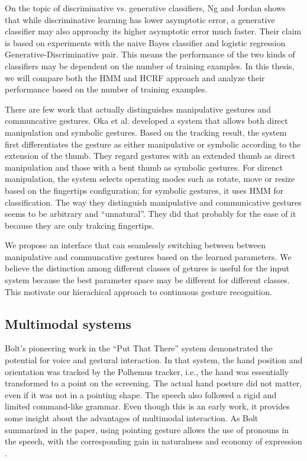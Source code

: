 On the topic of discriminative vs. generative classifiers, Ng and Jordan
\cite{ng02} shows that while discriminative learning has lower asymptotic error,
a generative classifier may also approachy its higher asymptotic error much
faster. Their claim is based on experiments with the naive Bayes classifier and
logistic regression Generative-Discriminative pair. This means the performance
of the two kinds of classifiers may be dependent on the number of training
examples. In this thesis, we will compare both the HMM and HCRF approach and
analyze their performance based on the number of training examples.

There are few work that actually distinguishes manipulative gestures and
communcative gestures. Oka et al. \cite{Oka02} developed a system that allows
both direct manipulation and symbolic gestures. Based on the tracking result,
the system first differentiates the gesture as either manipulative or symbolic 
according to the extension of the thumb. They regard gestures with an extended 
thumb as direct manipulation and those with a bent thumb as symbolic gestures. 
For direnct manipulation, the system selects operating modes such as rotate, 
move or resize based on the fingertips configuration; for symbolic gestures, it 
uses HMM for classification. The way they distinguish manipulative and 
communicative gestures seems to be arbitrary and ``unnatural''. They did that 
probably for the ease of it because they are only trakcing fingertips.

We propose an interface that can seamlessly switching between between
manipulative and communcative gestures based on the learned parameters. We
believe the distinction among different classes of getures is useful for the
input system because the best parameter space may be different for different
classes. This motivate our hierachical approach to continuous gesture
recognition.

\subsection{Multimodal systems}
Bolt's pioneering work in the ``Put That There'' system \cite{Bolt80} 
demonstrated the potential for voice and gestural interaction.  In that system, 
the hand position and orientation was tracked by the Polhemus tracker, i.e., the
hand was essentially transformed to a point on the screening. The actual hand 
posture did not matter, even if it was not in a pointing shape. The speech also 
followed a rigid and limited command-like grammar. Even though this is an early 
work, it provides some insight about the advantages of multimodal interaction. 
As Bolt summarized in the paper, using pointing gesture allows the use of 
pronouns in the speech, with the corresponding gain in naturalness and economy 
of expression \cite{Bolt80}.

